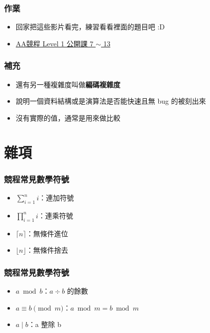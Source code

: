 \documentclass[mathserif]{beamer}
\begin{document}
\begin{frame}
    \frametitle{作業}
    \begin{itemize}
        \item 回家把這些影片看完，練習看看裡面的題目吧 :D
        \item \href{https://youtube.com/playlist?list=PLuV4P3EY8fXl-2qmLTZVWS3deHyxxWLUI}{AA競程 Level 1 公開課 7 $\sim$ 13}
    \end{itemize}
\end{frame}

\begin{frame}
    \frametitle{補充}
    \begin{itemize}
        \item 還有另一種複雜度叫做\textbf{編碼複雜度}
        \item 說明一個資料結構或是演算法是否能快速且無 bug 的被刻出來
        \item 沒有實際的值，通常是用來做比較
    \end{itemize}
\end{frame}

\section{雜項}

\begin{frame}
    \frametitle{競程常見數學符號}
    \begin{itemize}
        \item $\displaystyle\sum_{i=1}^{n} i$：連加符號
        \item $\displaystyle\prod_{i=1}^{n} i$：連乘符號
        \vspace{0.5cm}
        \item<2-> $\lceil n \rceil$：無條件進位
        \item<2-> $\lfloor n \rfloor$：無條件捨去
    \end{itemize}
\end{frame}

\begin{frame}
    \frametitle{競程常見數學符號}
    \begin{itemize}
        \item $a \bmod b$：$a \div b$ 的餘數
        \item $a \equiv b \pmod{m}$：$a \bmod m = b \bmod m$
        \item $a \mid b$：a 整除 b
    \end{itemize}
\end{frame}
\end{document}
